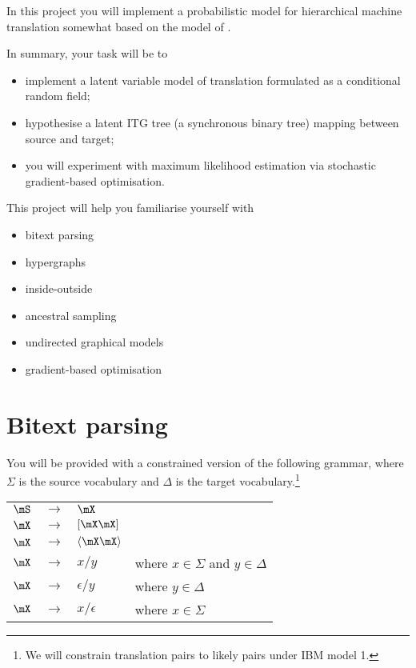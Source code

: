
In this project you will implement a probabilistic model for hierarchical machine translation somewhat based on the model of \citet{Blunsom+2008:LVMSMT}.

In summary, your task will be to
\begin{itemize}
	\item implement a latent variable model of translation formulated as a conditional random field;
	\item hypothesise a latent ITG tree (a synchronous binary tree) mapping between source and target;
	\item you will experiment with maximum likelihood estimation via stochastic gradient-based optimisation.
\end{itemize}

This project will help you familiarise yourself with 
\begin{multicols}{2}
\begin{itemize}
	\item bitext parsing
	\item hypergraphs
	\item inside-outside	
	\item ancestral sampling
	\item undirected graphical models
	\item gradient-based optimisation
\end{itemize}
\end{multicols}


\section{Bitext parsing\label{sec:ITG}}

You will be provided with a constrained version of the following grammar, where $\Sigma$ is the source vocabulary and $\Delta$ is the target vocabulary.\footnote{We will constrain translation pairs to likely pairs under IBM model 1.}

\begin{tabular}{l c l l}
$\mS$ & $\rightarrow$ & $\mX$ & \\
$\mX$ & $\rightarrow$ & $\left[\mX \mX\right]$ & \\
$\mX$ & $\rightarrow$ & $\left\langle \mX \mX \right\rangle$ & \\
$\mX$ & $\rightarrow$ & $x/y$ & where $x \in \Sigma$ and $y \in \Delta$ \\
$\mX$ & $\rightarrow$ & $\epsilon/y$ & where $y \in \Delta$\\
$\mX$ & $\rightarrow$ & $x/\epsilon$ & where $x \in \Sigma$\\
\end{tabular}

